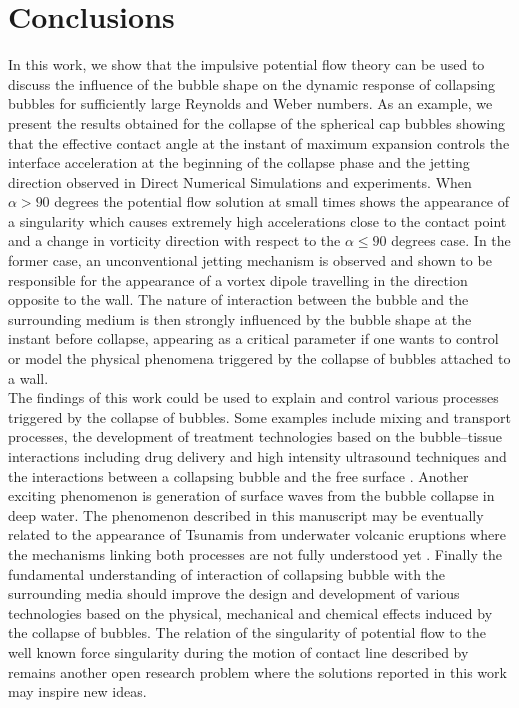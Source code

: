 \documentclass[final]{jfm}
\begin{document}
\section{Conclusions}
In this work, we show that the impulsive potential flow theory
can be used to discuss the influence of the bubble shape on the dynamic
response of collapsing bubbles for sufficiently
large Reynolds and Weber numbers.  As an example, we present the results obtained for the collapse of the spherical cap bubbles showing that the effective contact angle at the instant of maximum expansion controls the interface acceleration at the beginning of the collapse phase and the jetting direction observed in Direct Numerical Simulations and experiments. 
 When $\alpha > 90$ degrees the potential flow solution 
at small times shows the appearance of a singularity which causes extremely high accelerations close to the contact point and a change in vorticity direction
with respect to the $\alpha \le 90$ degrees case.
 In the former case, an unconventional jetting mechanism is observed and shown to be responsible for the appearance of a vortex dipole travelling in the direction opposite to the wall.
 The nature of interaction between the bubble and the surrounding medium
is then strongly influenced by the bubble shape at the instant before collapse, 
appearing as a critical parameter if one wants to control or model the physical phenomena triggered by the collapse of bubbles attached to a wall.
 \\

The findings of this work could be used to explain and control various processes triggered by the collapse of bubbles. Some examples include mixing and transport processes, the development of treatment technologies based on the bubble--tissue interactions including drug delivery and high intensity ultrasound techniques \citep{prentice2005membrane,ohl2006sonoporation,maxwell2011cavitation} and the interactions between a collapsing bubble and the free surface \citep{kedrinskii1978surface}. Another exciting phenomenon is generation of surface waves from the bubble collapse in deep water. The phenomenon described in this manuscript may be eventually related to the appearance of Tsunamis from underwater volcanic eruptions where the mechanisms linking both processes are not fully understood yet \cite{paris2015source}. Finally the fundamental understanding of interaction of collapsing bubble with the surrounding media should improve the design and development of various technologies based on the physical, mechanical and chemical effects induced by the collapse of bubbles. The relation of the singularity of potential flow to the well known force singularity during the motion of contact line described by \cite{huh1971hydrodynamic} remains another open research problem where the solutions reported in this work may inspire new ideas. 
 
\end{document}
